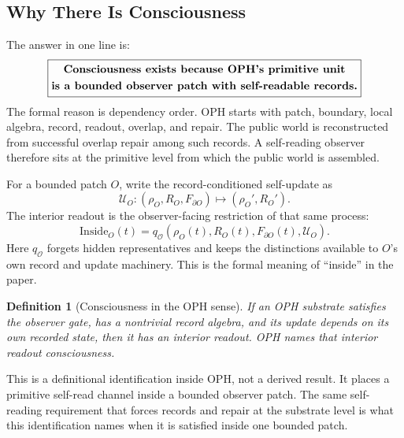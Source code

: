 \documentclass[11pt]{article}
\newtheorem{definition}[theorem]{Definition}
\theoremstyle{remark}
\theoremstyle{plain}
\begin{document}
\subsection{Why There Is Consciousness}

The answer in one line is:
\[
\boxed{
\begin{gathered}
\text{\bfseries Consciousness exists because OPH's primitive unit}\\
\text{\bfseries is a bounded observer patch with self-readable records.}
\end{gathered}
}
\]
The formal reason is dependency order. OPH starts with patch, boundary, local algebra, record, readout, overlap, and repair. The public world is reconstructed from successful overlap repair among such records. A self-reading observer therefore sits at the primitive level from which the public world is assembled.

For a bounded patch \(O\), write the record-conditioned self-update as
\[
\mathcal U_O:
(\rho_O,R_O,F_{\partial O})
\longmapsto
(\rho_O',R_O').
\]
The interior readout is the observer-facing restriction of that same process:
\[
\boxed{
\mathrm{Inside}_O(t)
=
q_{\mathcal O}
\!\left(
\rho_O(t),R_O(t),F_{\partial O}(t),\mathcal U_O
\right).
}
\]
Here \(q_{\mathcal O}\) forgets hidden representatives and keeps the distinctions available to \(O\)'s own record and update machinery. This is the formal meaning of ``inside'' in the paper.

\begin{definition}[Consciousness in the OPH sense]
If an OPH substrate satisfies the observer gate, has a nontrivial record algebra, and its update depends on its own recorded state, then it has an interior readout. OPH names that interior readout consciousness.
\end{definition}

This is a definitional identification inside OPH, not a derived result. It places a primitive self-read channel inside a bounded observer patch. The same self-reading requirement that forces records and repair at the substrate level is what this identification names when it is satisfied inside one bounded patch.
\end{document}
